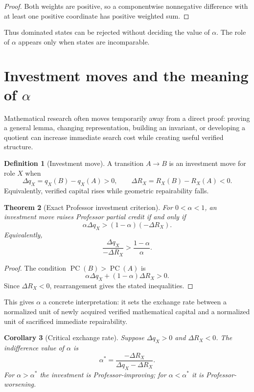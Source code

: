 \documentclass[11pt]{article}
\newtheorem{theorem}{Theorem}[section]
\newtheorem{corollary}[theorem]{Corollary}
\theoremstyle{definition}
\newtheorem{definition}[theorem]{Definition}
\theoremstyle{remark}
\newcommand{\PC}{\operatorname{PC}}
\begin{document}
\begin{proof}
Both weights are positive, so a componentwise nonnegative difference with at least one positive coordinate has positive weighted sum.
\end{proof}

Thus dominated states can be rejected without deciding the value of $\alpha$. The role of $\alpha$ appears only when states are incomparable.

\section{Investment moves and the meaning of \texorpdfstring{$\alpha$}{alpha}}

Mathematical research often moves temporarily away from a direct proof: proving a general lemma, changing representation, building an invariant, or developing a quotient can increase immediate search cost while creating useful verified structure.

\begin{definition}[Investment move]
A transition $A\to B$ is an investment move for role $X$ when
\[
\Delta q_X=q_X(B)-q_X(A)>0,
\qquad
\Delta R_X=R_X(B)-R_X(A)<0.
\]
Equivalently, verified capital rises while geometric repairability falls.
\end{definition}

\begin{theorem}[Exact Professor investment criterion]
For $0<\alpha<1$, an investment move raises Professor partial credit if and only if
\[
\boxed{
\alpha\Delta q_X>(1-\alpha)(-\Delta R_X).
}
\]
Equivalently,
\[
\boxed{
\frac{\Delta q_X}{-\Delta R_X}>\frac{1-\alpha}{\alpha}.
}
\]
\end{theorem}

\begin{proof}
The condition $\PC(B)>\PC(A)$ is
\[
\alpha\Delta q_X+(1-\alpha)\Delta R_X>0.
\]
Since $\Delta R_X<0$, rearrangement gives the stated inequalities.
\end{proof}

This gives $\alpha$ a concrete interpretation: it sets the exchange rate between a normalized unit of newly acquired verified mathematical capital and a normalized unit of sacrificed immediate repairability.

\begin{corollary}[Critical exchange rate]
Suppose $\Delta q_X>0$ and $\Delta R_X<0$. The indifference value of $\alpha$ is
\[
\boxed{
\alpha^*=\frac{-\Delta R_X}{\Delta q_X-\Delta R_X}.
}
\]
For $\alpha>\alpha^*$ the investment is Professor-improving; for $\alpha<\alpha^*$ it is Professor-worsening.
\end{corollary}
\end{document}
